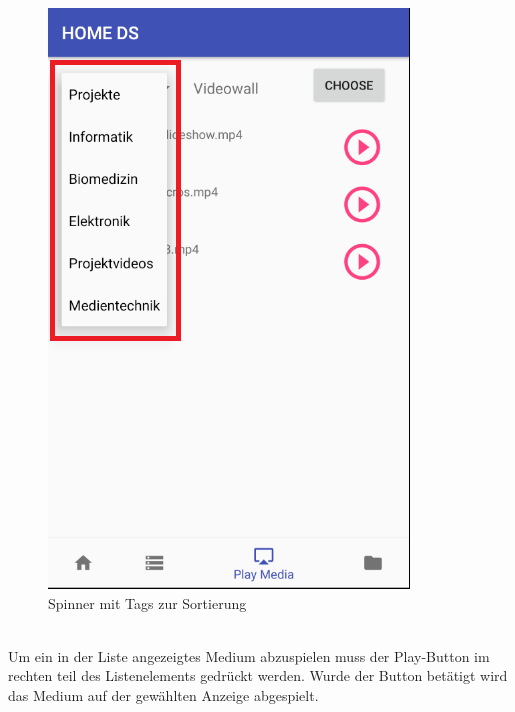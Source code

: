 \begin{figure}[H]
\centering
\includegraphics[scale=0.35]{images/06_AndroidApp/06_TagChoice}
\caption{Spinner mit Tags zur Sortierung}
\label{fig:mediaNav}
\end{figure}
\\
Um ein in der Liste angezeigtes Medium abzuspielen muss der Play-Button im rechten teil des Listenelements gedrückt werden. Wurde der Button betätigt wird das Medium auf der gewählten Anzeige abgespielt.
